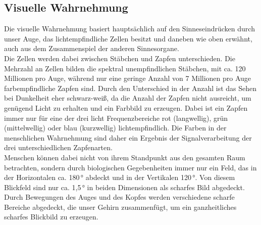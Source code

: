 \subsection{Visuelle Wahrnehmung}
Die visuelle Wahrnehmung basiert hauptsächlich auf den Sinneseindrücken durch unser Auge, das lichtempfindliche Zellen besitzt und daneben wie oben erwähnt, auch aus dem Zusammenspiel der anderen Sinnesorgane.\\
Die Zellen werden dabei zwischen Stäbchen und Zapfen unterschieden. Die Mehrzahl an Zellen bilden die spektral unempfindlichen Stäbchen, mit ca. 120 Millionen pro Auge, während nur eine geringe Anzahl von 7 Millionen pro Auge farbempfindliche Zapfen sind. Durch den Unterschied in der Anzahl ist das Sehen bei Dunkelheit eher schwarz-weiß, da die Anzahl der Zapfen nicht ausreicht, um genügend Licht zu erhalten und ein Farbbild zu erzeugen. Dabei ist ein Zapfen immer nur für eine der drei licht Frequenzbereiche rot (langwellig), grün (mittelwellig) oder blau (kurzwellig) lichtempfindlich. Die Farben in der menschlichen Wahrnehmung sind daher ein Ergebnis der Signalverarbeitung der drei unterschiedlichen Zapfenarten. \cite[Vgl. Seite 14]{Buhler.2017}\\
Menschen können dabei nicht von ihrem Standpunkt aus den gesamten Raum betrachten, sondern durch biologischen Gegebenheiten immer nur ein Feld, das in der Horizontalen ca. 180\,° abdeckt und in der Vertikalen 120\,°. Von diesem Blickfeld sind nur ca. 1,5\,° in beiden Dimensionen als scharfes Bild abgedeckt. Durch Bewegungen des Auges und des Kopfes werden verschiedene scharfe Bereiche abgedeckt, die unser Gehirn zusammenfügt, um ein ganzheitliches scharfes Blickbild zu erzeugen. \cite[Vgl. Seite 14]{Buhler.2017}
